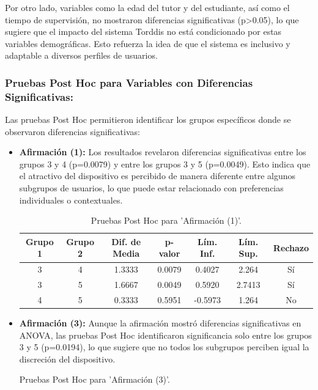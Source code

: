 \documentclass[a4paper,fleqn]{cas-sc}
\begin{document}
					Por otro lado, variables como la edad del tutor y del estudiante, así como el tiempo de supervisión, no mostraron diferencias significativas (p>0.05), lo que sugiere que el impacto del sistema Torddis no está condicionado por estas variables demográficas. Esto refuerza la idea de que el sistema es inclusivo y adaptable a diversos perfiles de usuarios.
						
				\subsubsection{Pruebas Post Hoc para Variables con Diferencias Significativas:}
					Las pruebas Post Hoc permitieron identificar los grupos específicos donde se observaron diferencias significativas:
						
					\begin{itemize}
						\item \textbf{Afirmación (1):} Los resultados revelaron diferencias significativas entre los grupos 3 y 4 (p=0.0079) y entre los grupos 3 y 5 (p=0.0049). Esto indica que el atractivo del dispositivo es percibido de manera diferente entre algunos subgrupos de usuarios, lo que puede estar relacionado con preferencias individuales o contextuales.
							\begin{table}[ht]
								\centering
								\caption{Pruebas Post Hoc para 'Afirmación (1)'.}
								\begin{tabularx}{0.75\textwidth}{ccccccc}
									\hline
									\textbf{Grupo 1} & \textbf{Grupo 2} & \textbf{Dif. de Media} & \textbf{p-valor} & \textbf{Lím. Inf.} & \textbf{Lím. Sup.} & \textbf{Rechazo} \\
									\hline
									3 & 4 & 1.3333 & 0.0079 & 0.4027 & 2.264 & Sí \\
									3 & 5 & 1.6667 & 0.0049 & 0.5920 & 2.7413 & Sí \\
									4 & 5 & 0.3333 & 0.5951 & -0.5973 & 1.264 & No \\
									\hline
								\end{tabularx}
								\label{table:posthoc_1}
							\end{table}
						\item \textbf{Afirmación (3):} Aunque la afirmación mostró diferencias significativas en ANOVA, las pruebas Post Hoc identificaron significancia solo entre los grupos 3 y 5 (p=0.0194), lo que sugiere que no todos los subgrupos perciben igual la discreción del dispositivo.
							\begin{table}[ht]
								\centering
								\caption{Pruebas Post Hoc para 'Afirmación (3)'.}

\end{table}
\end{itemize}
\end{document}
